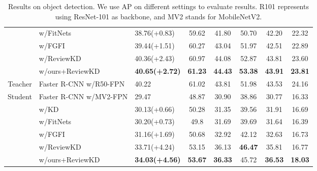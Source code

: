 \documentclass[letterpaper]{article} %
\begin{document}
\begin{table}[!h]
\begin{tabular}{@{}cl|lccccc@{}}
        & w/FitNets                 & 38.76(+0.83)          & 59.62          & 41.80          & 50.70          & 42.20          & 22.32          \\
        & w/FGFI                  & 39.44(+1.51)          & 60.27          & 43.04          & 51.97          & 42.51          & 22.89          \\
        & w/ReviewKD              & 40.36(+2.43)          & 60.97          & 44.08          & 52.87          & 43.81          & 23.60          \\
        & w/ours+ReviewKD                  & \textbf{40.65(+2.72)} & \textbf{61.23} & \textbf{44.43} & \textbf{53.38} & \textbf{43.91} & \textbf{23.81} \\ \hline
Teacher & Faster R-CNN w/R50-FPN  & 40.22          & 61.02          & 43.81          & 51.98          & 43.53          & 24.16          \\
Student & Faster R-CNN w/MV2-FPN  & 29.47          & 48.87          & 30.90          & 38.86          & 30.77          & 16.33          \\
        & w/KD                    & 30.13(+0.66)          & 50.28          & 31.35          & 39.56          & 31.91          & 16.69          \\
        & w/FitNets                 & 30.20(+0.73)          & 49.8           & 31.69          & 39.69          & 31.64          & 16.39          \\
        & w/FGFI                  & 31.16(+1.69)          & 50.68          & 32.92          & 42.12          & 32.63          & 16.73          \\
        & w/ReviewKD              & 33.71(+4.24)          & 53.15          & 36.13          & \textbf{46.47} & 35.81          & 16.77          \\
        & w/ours+ReviewKD                  & \textbf{34.03(+4.56)} & \textbf{53.67} & \textbf{36.33} & 45.72          & \textbf{36.53} & \textbf{18.03}
\end{tabular}

\caption{Results on object detection. We use AP on different settings to evaluate results. R101 represents using ResNet-101 as backbone, and MV2 stands for MobileNetV2.}
\label{objection}
\end{table}
\end{document}
